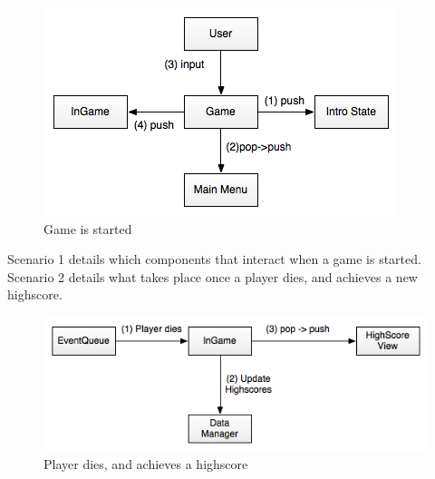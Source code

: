 \begin{figure}[H]
	\begin{center}
		\includegraphics[scale=0.75]{graphics/scenario_1_StartingGame}
	\end{center}
        \caption{Game is started}
\end{figure}

Scenario 1 details which components that interact when a game is started. Scenario
2 details what takes place once a player dies, and achieves a new highscore.

\begin{figure}[H]
	\begin{center}
		\includegraphics[scale=0.75]{graphics/scenario_2_PlayerDiesHighScore}
	\end{center}
        \caption{Player dies, and achieves a highscore}
\end{figure}
